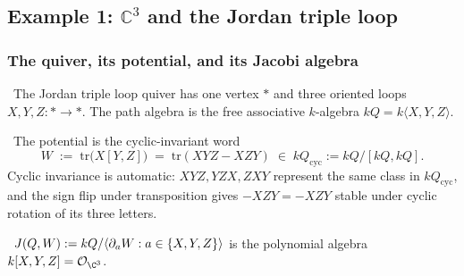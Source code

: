 \subsection{Example 1: $\mathbb{C}^3$ and the Jordan triple loop}
\label{w17:subsec:c3-full-chain}

\subsubsection{The quiver, its potential, and its Jacobi algebra}
\label{w17:subsubsec:jordan-triple-jacobi}

\begin{definition}
\label{w17:def:jordan-triple-quiver}
\ClaimStatusDefinition\ The Jordan triple loop quiver has one vertex $*$ and three
oriented loops $X, Y, Z: * \to *$. The path algebra is the free associative
$k$-algebra $kQ = k\langle X, Y, Z\rangle$.
\end{definition}

\begin{definition}
\label{w17:def:cubic-potential}
\ClaimStatusDefinition\ The potential is the cyclic-invariant word
\[
 W \;:=\; \mathrm{tr}\bigl(X[Y,Z]\bigr) \;=\; \mathrm{tr}(XYZ - XZY)
 \;\in\; kQ_{\mathrm{cyc}} := kQ/[kQ, kQ].
\]
Cyclic invariance is automatic: $XYZ, YZX, ZXY$ represent the same class in
$kQ_{\mathrm{cyc}}$, and the sign flip under transposition gives $-XZY = -XZY$
stable under cyclic rotation of its three letters.
\end{definition}

\begin{proposition}
\label{w17:prop:jacobi-c3}
\ClaimStatusDerivation\
$J(Q, W) := kQ/\langle \partial_a W : a \in \{X, Y, Z\}\rangle$ is the
polynomial algebra $k[X, Y, Z] = \mathcal{O}_{\C^3}$.
\end{proposition}

